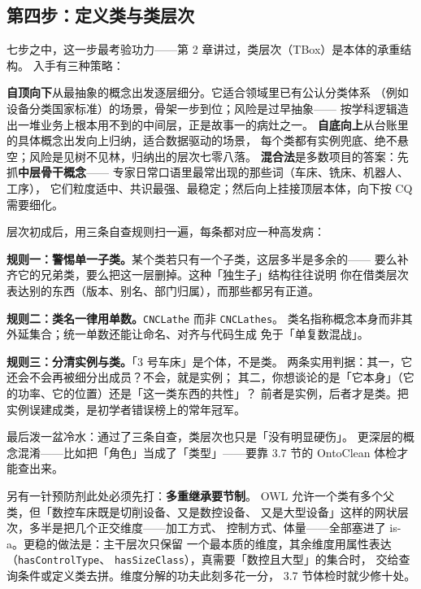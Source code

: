 \subsection{第四步：定义类与类层次}

七步之中，这一步最考验功力——第 2 章讲过，类层次（TBox）是本体的承重结构。
入手有三种策略：



\textbf{自顶向下}从最抽象的概念出发逐层细分。它适合领域里已有公认分类体系
（例如设备分类国家标准）的场景，骨架一步到位；风险是过早抽象——
按学科逻辑造出一堆业务上根本用不到的中间层，正是故事一的病灶之一。
\textbf{自底向上}从台账里的具体概念出发向上归纳，适合数据驱动的场景，
每个类都有实例兜底、绝不悬空；风险是见树不见林，归纳出的层次七零八落。
\textbf{混合法}是多数项目的答案：先抓\textbf{中层骨干概念}——
专家日常口语里最常出现的那些词（车床、铣床、机器人、工序），
它们粒度适中、共识最强、最稳定；然后向上挂接顶层本体，向下按 CQ 需要细化。

层次初成后，用三条自查规则扫一遍，每条都对应一种高发病：

\textbf{规则一：警惕单一子类。}某个类若只有一个子类，这层多半是多余的——
要么补齐它的兄弟类，要么把这一层删掉。这种「独生子」结构往往说明
你在借类层次表达别的东西（版本、别名、部门归属），而那些都另有正道。

\textbf{规则二：类名一律用单数。}\texttt{CNCLathe} 而非 \texttt{CNCLathes}。
类名指称概念本身而非其外延集合；统一单数还能让命名、对齐与代码生成
免于「单复数混战」。

\textbf{规则三：分清实例与类。}「3 号车床」是个体，不是类。
两条实用判据：其一，它还会不会再被细分出成员？不会，就是实例；
其二，你想谈论的是「它本身」（它的功率、它的位置）还是「这一类东西的共性」？
前者是实例，后者才是类。把实例误建成类，是初学者错误榜上的常年冠军。

最后泼一盆冷水：通过了三条自查，类层次也只是「没有明显硬伤」。
更深层的概念混淆——比如把「角色」当成了「类型」——要靠 3.7 节的
OntoClean 体检才能查出来。

另有一针预防剂此处必须先打：\textbf{多重继承要节制}。
OWL 允许一个类有多个父类，但「数控车床既是切削设备、又是数控设备、
又是大型设备」这样的网状层次，多半是把几个正交维度——加工方式、
控制方式、体量——全部塞进了 is-a。更稳的做法是：主干层次只保留
一个最本质的维度，其余维度用属性表达（\texttt{hasControlType}、
\texttt{hasSizeClass}），真需要「数控且大型」的集合时，
交给查询条件或定义类去拼。维度分解的功夫此刻多花一分，
3.7 节体检时就少修十处。

